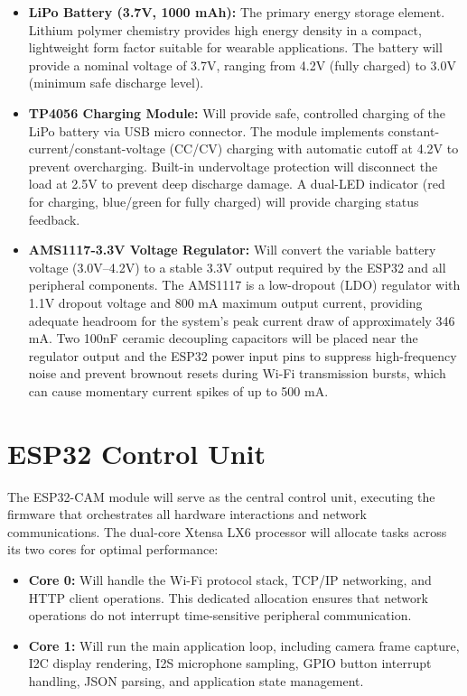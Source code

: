 \begin{itemize}[leftmargin=1.5cm]
\item \textbf{LiPo Battery (3.7V, 1000 mAh):} The primary energy storage element. Lithium polymer chemistry provides high energy density in a compact, lightweight form factor suitable for wearable applications. The battery will provide a nominal voltage of 3.7V, ranging from 4.2V (fully charged) to 3.0V (minimum safe discharge level).

\item \textbf{TP4056 Charging Module:} Will provide safe, controlled charging of the LiPo battery via USB micro connector. The module implements constant-current/constant-voltage (CC/CV) charging with automatic cutoff at 4.2V to prevent overcharging. Built-in undervoltage protection will disconnect the load at 2.5V to prevent deep discharge damage. A dual-LED indicator (red for charging, blue/green for fully charged) will provide charging status feedback.

\item \textbf{AMS1117-3.3V Voltage Regulator:} Will convert the variable battery voltage (3.0V--4.2V) to a stable 3.3V output required by the ESP32 and all peripheral components. The AMS1117 is a low-dropout (LDO) regulator with 1.1V dropout voltage and 800 mA maximum output current, providing adequate headroom for the system's peak current draw of approximately 346 mA. Two 100nF ceramic decoupling capacitors will be placed near the regulator output and the ESP32 power input pins to suppress high-frequency noise and prevent brownout resets during Wi-Fi transmission bursts, which can cause momentary current spikes of up to 500 mA.
\end{itemize}

\section{ESP32 Control Unit}
The ESP32-CAM module will serve as the central control unit, executing the firmware that orchestrates all hardware interactions and network communications. The dual-core Xtensa LX6 processor will allocate tasks across its two cores for optimal performance:

\begin{itemize}[leftmargin=1.5cm]
\item \textbf{Core 0:} Will handle the Wi-Fi protocol stack, TCP/IP networking, and HTTP client operations. This dedicated allocation ensures that network operations do not interrupt time-sensitive peripheral communication.

\item \textbf{Core 1:} Will run the main application loop, including camera frame capture, I2C display rendering, I2S microphone sampling, GPIO button interrupt handling, JSON parsing, and application state management.
\end{itemize}

